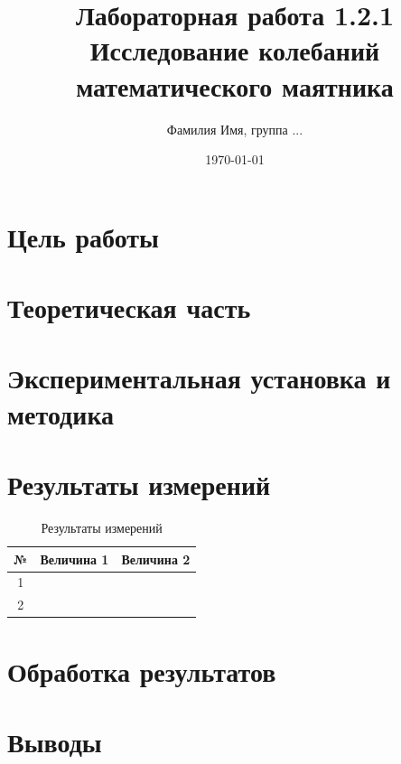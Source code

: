 \documentclass[12pt]{article}
\title{Лабораторная работа 1.2.1 \\ Исследование колебаний математического маятника}
\author{Фамилия Имя, группа ...}
\date{\today}
\begin{document}
\maketitle

\section{Цель работы}

\section{Теоретическая часть}

\section{Экспериментальная установка и методика}

\section{Результаты измерений}

\begin{table}[h]
    \centering
    \caption{Результаты измерений}
    \begin{tabular}{ccc}
        \toprule
        № & Величина 1 & Величина 2 \\
        \midrule
        1 & & \\
        2 & & \\
        \bottomrule
    \end{tabular}
\end{table}

\section{Обработка результатов}

\section{Выводы}
\end{document}
